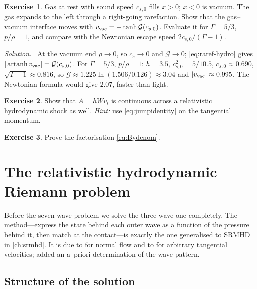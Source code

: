 \documentclass[11pt,a4paper,oneside,openany]{book}
\newcommand{\textcite}{\citet}
\theoremstyle{definition}
\newtheorem{exercise}{Exercise}[chapter]
\theoremstyle{plain}
\theoremstyle{remark}
\newenvironment{solution}{\par\smallskip\noindent\small\textit{Solution.}\ }{\par\medskip}
\begin{document}
\begin{exercise}
Gas at rest with sound speed $c_{s,0}$ fills $x>0$; $x<0$ is vacuum. The gas expands to the
left through a right-going rarefaction. Show that the gas--vacuum interface moves with
$v_{\rm vac}=-\tanh\mathcal G(c_{s,0})$. Evaluate it for $\Gamma=5/3$, $p/\rho=1$, and compare
with the Newtonian escape speed $2c_{s,0}/(\Gamma-1)$.
\end{exercise}
\begin{solution}
At the vacuum end $\rho\to0$, so $c_s\to0$ and $\mathcal G\to0$; \eqref{eq:raref-hydro}
gives $|\operatorname{artanh}v_{\rm vac}|=\mathcal G(c_{s,0})$. For $\Gamma=5/3$, $p/\rho=1$:
$h=3.5$, $c_{s,0}^2=5/10.5$, $c_{s,0}\approx0.690$, $\sqrt{\Gamma-1}\approx0.816$, so
$\mathcal G\approx1.225\ln(1.506/0.126)\approx3.04$ and $|v_{\rm vac}|\approx0.995$. The
Newtonian formula would give $2.07$, faster than light.
\end{solution}

\begin{exercise}
Show that $A=hWv_t$ is continuous across a relativistic hydrodynamic shock as well.
\emph{Hint:} use \eqref{eq:jumpidentity} on the tangential momentum.
\end{exercise}

\begin{exercise}
Prove the factorisation \eqref{eq:Bydenom}.
\end{exercise}


\chapter{The relativistic hydrodynamic Riemann problem}\label{ch:hydro}

Before the seven-wave problem we solve the three-wave one completely. The method---express
the state behind each outer wave as a function of the pressure behind it, then match at
the contact---is exactly the one generalised to SRMHD in \cref{ch:srmhd}. It is due to
\textcite{MartiMuller1994} for normal flow and to \textcite{Pons2000} for arbitrary
tangential velocities; \textcite{RezzollaZanotti2001,RezzollaZanottiPons2003} added an
a~priori determination of the wave pattern.

\section{Structure of the solution}
\end{document}

